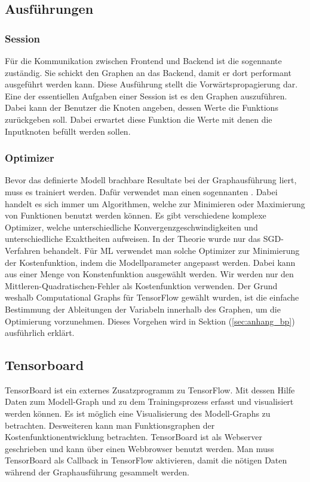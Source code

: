 \subsection{Ausführungen}
\subsubsection{Session}
Für die Kommunikation zwischen Frontend und Backend ist die sogennante
 zuständig. Sie schickt den Graphen an das Backend, damit er
dort performant ausgeführt werden kann. Diese Ausführung stellt die
Vorwärtspropagierung dar.
\para{}
Eine der essentiellen Aufgaben einer Session ist es den Graphen auszuführen.
Dabei kann der Benutzer die Knoten angeben, dessen Werte die Funktions
zurückgeben soll. Dabei erwartet diese Funktion die Werte mit denen die
Inputknoten befüllt werden sollen.


\subsubsection{Optimizer}
Bevor das definierte Modell brachbare Resultate bei der Graphausführung liert,
muss es trainiert werden. Dafür verwendet man einen sogennanten .
Dabei handelt es sich immer um Algorithmen, welche zur Minimieren oder
Maximierung von Funktionen benutzt werden können.
Es gibt verschiedene komplexe Optimizer, welche unterschiedliche
Konvergenzgeschwindigkeiten und unterschiedliche Exaktheiten aufweisen. In der
Theorie wurde nur das SGD-Verfahren behandelt.
\para{}
Für ML verwendet man solche Optimizer zur Minimierung der Kostenfunktion, indem die Modellparameter
angepasst werden. Dabei kann aus einer Menge von Konstenfunktion ausgewählt
werden. Wir werden nur den Mittleren-Quadratischen-Fehler als Kostenfunktion verwenden.
\para{}
Der Grund weshalb Computational Graphs für TensorFlow gewählt wurden, ist die
einfache Bestimmung der Ableitungen der Variabeln innerhalb des Graphen, um die
Optimierung vorzunehmen. Dieses Vorgehen wird in Sektion (\ref{sec:anhang_bp})
ausführlich erklärt.

\subsection{Tensorboard}
TensorBoard ist ein externes Zusatzprogramm zu TensorFlow. Mit dessen Hilfe
Daten zum Modell-Graph und zu dem Trainingsprozess erfasst
und visualisiert werden können.
Es ist möglich eine Visualisierung des Modell-Graphs zu betrachten. Desweiteren
kann man Funktionsgraphen der Kostenfunktionentwicklung betrachten.
\para{}
TensorBoard ist als Webserver geschrieben und kann über einen Webbrowser
benutzt werden.
Man muss TensorBoard als Callback in TensorFlow aktivieren, damit die
nötigen Daten während der Graphausführung gesammelt werden.

